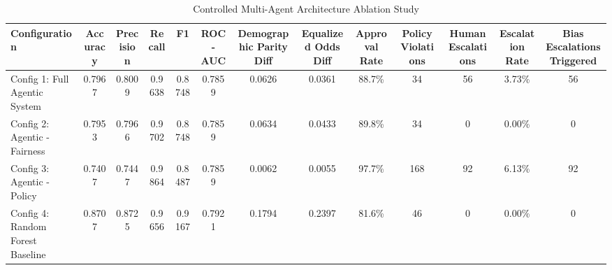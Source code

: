 \begin{table}[htbp]
\centering
\caption{Controlled Multi-Agent Architecture Ablation Study}
\label{tab:ablation}
\begin{tabular}{lcccccccccccc}
\hline
Configuration & Accuracy & Precision & Recall & F1 & ROC-AUC & Demographic Parity Diff & Equalized Odds Diff & Approval Rate & Policy Violations & Human Escalations & Escalation Rate & Bias Escalations Triggered \\
\hline
Config 1: Full Agentic System & 0.7967 & 0.8009 & 0.9638 & 0.8748 & 0.7859 & 0.0626 & 0.0361 & 88.7\% & 34 & 56 & 3.73\% & 56 \\
Config 2: Agentic - Fairness & 0.7953 & 0.7966 & 0.9702 & 0.8748 & 0.7859 & 0.0634 & 0.0433 & 89.8\% & 34 & 0 & 0.00\% & 0 \\
Config 3: Agentic - Policy & 0.7407 & 0.7447 & 0.9864 & 0.8487 & 0.7859 & 0.0062 & 0.0055 & 97.7\% & 168 & 92 & 6.13\% & 92 \\
Config 4: Random Forest Baseline & 0.8707 & 0.8725 & 0.9656 & 0.9167 & 0.7921 & 0.1794 & 0.2397 & 81.6\% & 46 & 0 & 0.00\% & 0 \\
\hline
\end{tabular}
\end{table}
